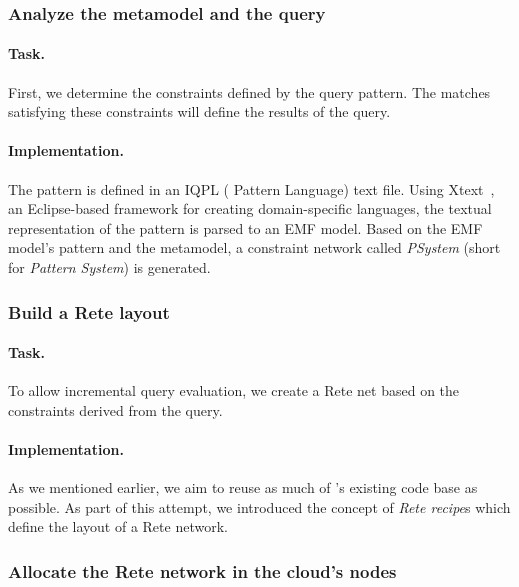 
\subsubsection{Analyze the metamodel and the query}

\paragraph{Task.} First, we determine the constraints defined by the query pattern. The matches satisfying these constraints will define the results of the query.

\paragraph{Implementation.} The pattern is defined in an IQPL (\iq{} Pattern Language) text file. Using Xtext~\cite{Xtext}, an Eclipse-based framework for creating domain-specific languages, the textual representation of the pattern is parsed to an EMF model. Based on the EMF model's pattern and the metamodel, a constraint network called \textit{PSystem} (short for \textit{Pattern System}) is generated. 

\subsubsection{Build a Rete layout}

\paragraph{Task.} To allow incremental query evaluation, we create a Rete net based on the constraints derived from the query.

\paragraph{Implementation.} As we mentioned earlier, we aim to reuse as much of \eiq{}'s existing code base as possible. As part of this attempt, we introduced the concept of \textit{Rete recipe}s which define the layout of a Rete network.    

\subsubsection{Allocate the Rete network in the cloud's nodes} 

